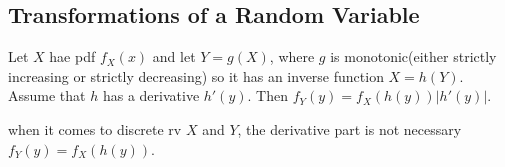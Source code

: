 \subsection{Transformations of a Random Variable}

\begin{theorem}
    Let $X$ hae pdf $f_X(x)$ and let $Y=g(X)$, where $g$ is monotonic(either strictly increasing or strictly decreasing) so it has an inverse function $X=h(Y)$. Assume that $h$ has a derivative $h'(y)$. Then $f_Y(y) = f_X(h(y))|h'(y)|$.

    when it comes to discrete rv $X$ and $Y$, the derivative part is not necessary $f_Y(y) = f_X(h(y))$.
\end{theorem}

